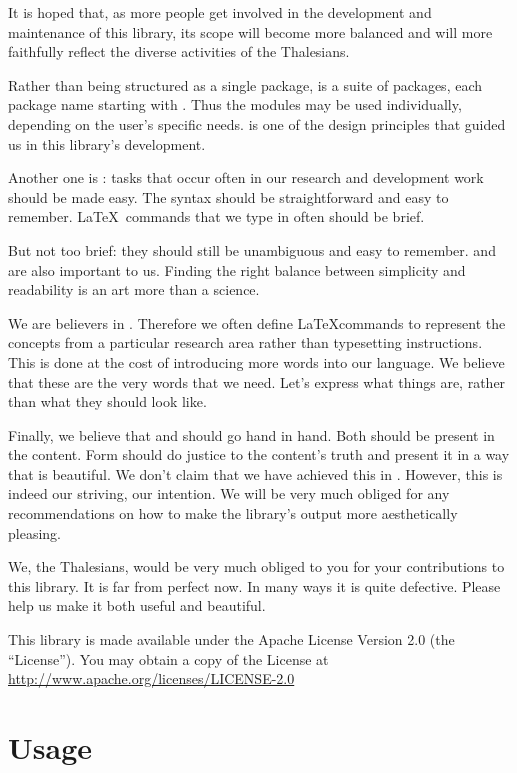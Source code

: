 It is hoped that, as more people get involved in the development and maintenance of this library, its scope will become more balanced and will more faithfully reflect the diverse activities of the Thalesians.

Rather than being structured as a single package, \LaThalesians is a suite of packages, each package name starting with . Thus the modules may be used individually, depending on the user's specific needs.  is one of the design principles that guided us in this library's development.

Another one is : tasks that occur often in our research and development work should be made easy. The syntax should be straightforward and easy to remember. \LaTeX~commands that we type in often should be brief.

But not too brief: they should still be unambiguous and easy to remember.  and  are also important to us. Finding the right balance between simplicity and readability is an art more than a science.

We are believers in . Therefore we often define \LaTeX commands to represent the concepts from a particular research area rather than typesetting instructions. This is done at the cost of introducing more words into our language. We believe that these are the very words that we need. Let's express what things are, rather than what they should look like.

Finally, we believe that  and  should go hand in hand. Both should be present in the content. Form should do justice to the content's truth and present it in a way that is beautiful. We don't claim that we have achieved this in \LaThalesians. However, this is indeed our striving, our intention. We will be very much obliged for any recommendations on how to make the library's output more aesthetically pleasing.

We, the Thalesians, would be very much obliged to you for your contributions to this library. It is far from perfect now. In many ways it is quite defective. Please help us make it both useful and beautiful.

This library is made available under the Apache License Version 2.0 (the ``License''). You may obtain a copy of the License at \url{http://www.apache.org/licenses/LICENSE-2.0}

\section{Usage}

